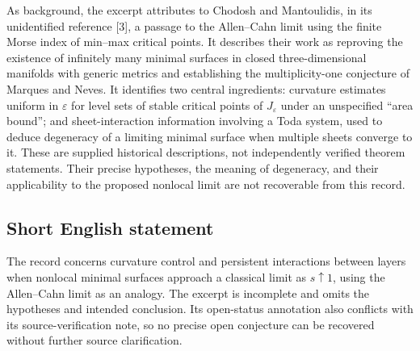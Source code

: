 \documentclass[11pt]{article}
\begin{document}
As background, the excerpt attributes to Chodosh and Mantoulidis, in its unidentified reference [3], a passage to the Allen--Cahn limit using the finite Morse index of min--max critical points. It describes their work as reproving the existence of infinitely many minimal surfaces in closed three-dimensional manifolds with generic metrics and establishing the multiplicity-one conjecture of Marques and Neves. It identifies two central ingredients: curvature estimates uniform in \(\varepsilon\) for level sets of stable critical points of \(J_\varepsilon\) under an unspecified ``area bound''; and sheet-interaction information involving a Toda system, used to deduce degeneracy of a limiting minimal surface when multiple sheets converge to it. These are supplied historical descriptions, not independently verified theorem statements. Their precise hypotheses, the meaning of degeneracy, and their applicability to the proposed nonlocal limit are not recoverable from this record.
\subsection{Short English statement}
The record concerns curvature control and persistent interactions between layers when nonlocal minimal surfaces approach a classical limit as \(s\uparrow 1\), using the Allen--Cahn limit as an analogy. The excerpt is incomplete and omits the hypotheses and intended conclusion. Its open-status annotation also conflicts with its source-verification note, so no precise open conjecture can be recovered without further source clarification.
\end{document}
